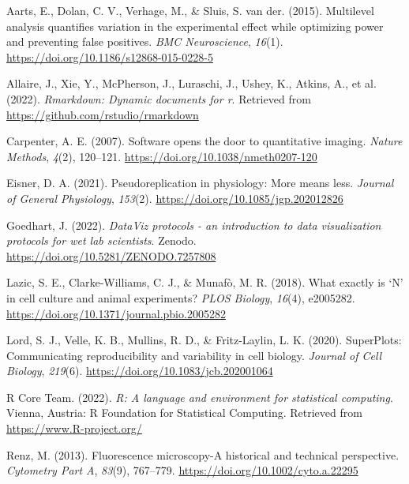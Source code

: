 \documentclass[
]{agujournal2019}
\newlength{\cslhangindent}
\newlength{\cslentryspacingunit} %
\newenvironment{CSLReferences}[2] %
 {%
  \setlength{\parindent}{0pt}
  \ifodd #1
  \let\oldpar\par
  \def\par{\hangindent=\cslhangindent\oldpar}
  \fi
  \setlength{\parskip}{#2\cslentryspacingunit}
 }%
 {}
\begin{document}
\hypertarget{refs}{}
\begin{CSLReferences}{1}{0}
\vspace{1em}

\leavevmode{}%
Aarts, E., Dolan, C. V., Verhage, M., \& Sluis, S. van der. (2015).
Multilevel analysis quantifies variation in the experimental effect
while optimizing power and preventing false positives. \emph{BMC
Neuroscience}, \emph{16}(1).
\url{https://doi.org/10.1186/s12868-015-0228-5}

\leavevmode{}%
Allaire, J., Xie, Y., McPherson, J., Luraschi, J., Ushey, K., Atkins,
A., et al. (2022). \emph{Rmarkdown: Dynamic documents for r}. Retrieved
from \url{https://github.com/rstudio/rmarkdown}

\leavevmode{}%
Carpenter, A. E. (2007). Software opens the door to quantitative
imaging. \emph{Nature Methods}, \emph{4}(2), 120--121.
\url{https://doi.org/10.1038/nmeth0207-120}

\leavevmode{}%
Eisner, D. A. (2021). Pseudoreplication in physiology: More means less.
\emph{Journal of General Physiology}, \emph{153}(2).
\url{https://doi.org/10.1085/jgp.202012826}

\leavevmode{}%
Goedhart, J. (2022). \emph{DataViz protocols - an introduction to data
visualization protocols for wet lab scientists}. Zenodo.
\url{https://doi.org/10.5281/ZENODO.7257808}

\leavevmode{}%
Lazic, S. E., Clarke-Williams, C. J., \& Munafò, M. R. (2018). What
exactly is {`}N{'} in cell culture and animal experiments? \emph{PLOS
Biology}, \emph{16}(4), e2005282.
\url{https://doi.org/10.1371/journal.pbio.2005282}

\leavevmode{}%
Lord, S. J., Velle, K. B., Mullins, R. D., \& Fritz-Laylin, L. K.
(2020). SuperPlots: Communicating reproducibility and variability in
cell biology. \emph{Journal of Cell Biology}, \emph{219}(6).
\url{https://doi.org/10.1083/jcb.202001064}

\leavevmode{}%
R Core Team. (2022). \emph{R: A language and environment for statistical
computing}. Vienna, Austria: R Foundation for Statistical Computing.
Retrieved from \url{https://www.R-project.org/}

\leavevmode{}%
Renz, M. (2013). Fluorescence microscopy-A historical and technical
perspective. \emph{Cytometry Part A}, \emph{83}(9), 767--779.
\url{https://doi.org/10.1002/cyto.a.22295}


\end{CSLReferences}
\end{document}

